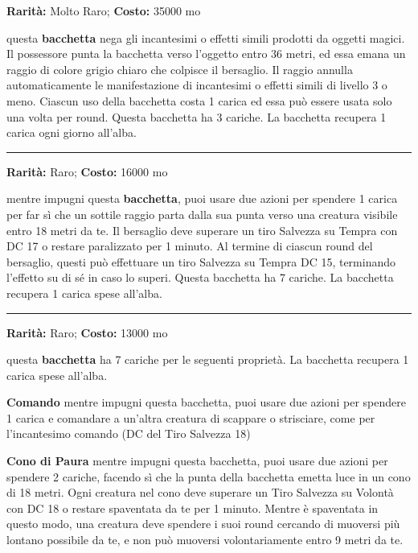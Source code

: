 \begin{multicols}{2}
\textbf{Rarità:} Molto Raro; \textbf{Costo:} 35000 mo

questa \textbf{bacchetta} nega gli incantesimi o effetti simili prodotti da oggetti magici. Il possessore punta la bacchetta verso l'oggetto entro 36 metri, ed essa emana un raggio di colore grigio chiaro che colpisce il bersaglio. Il raggio annulla automaticamente le manifestazione di incantesimi o effetti simili di livello 3 o meno. Ciascun uso della bacchetta costa 1 carica ed essa può essere usata solo una volta per round. Questa bacchetta ha 3 cariche. La bacchetta recupera 1 carica ogni giorno all'alba.

\smallskip\noindent\rule{\linewidth}{2pt}  \hypertarget{BacchettadellaParalisi}{}\smallskip{}\noindent\label{BacchettadellaParalisi}

\textbf{Rarità:} Raro; \textbf{Costo:} 16000 mo

mentre impugni questa \textbf{bacchetta}, puoi usare due azioni per spendere 1 carica per far sì che un sottile raggio parta dalla sua punta verso una creatura visibile entro 18 metri da te. Il bersaglio deve superare un tiro Salvezza su Tempra con DC 17 o restare paralizzato per 1 minuto. Al termine di ciascun round del bersaglio, questi può effettuare un tiro Salvezza su Tempra DC 15, terminando l'effetto su di sé in caso lo superi. Questa bacchetta ha 7 cariche. La bacchetta recupera 1 carica spese all'alba.

\smallskip\noindent\rule{\linewidth}{2pt}  \hypertarget{BacchettadellaPaura}{}\smallskip{}\noindent\label{BacchettadellaPaura}

\textbf{Rarità:} Raro; \textbf{Costo:} 13000 mo

questa \textbf{bacchetta} ha 7 cariche per le seguenti proprietà. La bacchetta recupera 1 carica spese all'alba.

\textbf{Comando} mentre impugni questa bacchetta, puoi usare due azioni per spendere 1 carica e comandare a un'altra creatura di scappare o strisciare, come per l'incantesimo comando (DC del Tiro Salvezza 18)

\textbf{Cono di Paura} mentre impugni questa bacchetta, puoi usare due azioni per spendere 2 cariche, facendo sì che la punta della bacchetta emetta luce in un cono di 18 metri. Ogni creatura nel cono deve superare un Tiro Salvezza su Volontà con DC 18 o restare spaventata da te per 1 minuto. Mentre è spaventata in questo modo, una creatura deve spendere i suoi round cercando di muoversi più lontano possibile da te, e non può muoversi volontariamente entro 9 metri da te.


\end{multicols}
